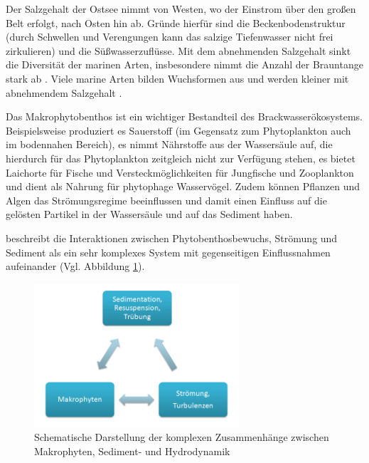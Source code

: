 Der Salzgehalt der Ostsee nimmt von Westen, wo der Einstrom über den großen Belt erfolgt, nach Osten hin ab. Gründe hierfür sind die Beckenbodenstruktur (durch Schwellen und Verengungen kann das salzige Tiefenwasser nicht frei zirkulieren) und die Süßwasserzuflüsse. Mit dem abnehmenden Salzgehalt sinkt die Diversität der marinen Arten, insbesondere nimmt die Anzahl der Brauntange stark ab \citep{schwenke_1995}. Viele marine Arten bilden Wuchsformen aus und werden kleiner mit abnehmendem Salzgehalt \citep{schwenke_1995}.

Das Makrophytobenthos ist ein wichtiger Bestandteil des Brackwasserökosystems. Beispielsweise produziert es Sauerstoff (im  Gegensatz zum Phytoplankton auch im bodennahen Bereich), es nimmt Nährstoffe aus der Wassersäule auf, die hierdurch für das Phytoplankton zeitgleich nicht zur Verfügung stehen, es bietet Laichorte für Fische und Versteckmöglichkeiten für Jungfische und Zooplankton und dient als Nahrung für phytophage Wasservögel.
Zudem können Pflanzen und Algen das Strömungsregime beeinflussen \citep{leonard_2006, li_2014, hurd_1997, siniscalchi_2012} und damit einen Einfluss auf die gelösten Partikel in der Wassersäule \citep{horppila_2003, leonard_1997, leonard_2006, ward_1984} und auf das Sediment \citep{madsen_2001} haben. 

\citep{madsen_2001} beschreibt die Interaktionen zwischen Phytobenthosbewuchs, Strömung und Sediment als ein sehr komplexes System mit gegenseitigen Einflussnahmen aufeinander (Vgl. Abbildung \ref{fig:schema_Makrophyten,Sedimente,Hydrodynamik}).


\begin{figure}[htb]
\centering
\includegraphics[width=0.68\textwidth]{images/Schema_Pfl_Sedim_Strm}
\caption[Zusammenhänge zwischen Makrophyten, Sediment- und Hydrodynamik]{Schematische Darstellung der komplexen Zusammenhänge zwischen Makrophyten, Sediment- und Hydrodynamik}
\label{fig:schema_Makrophyten,Sedimente,Hydrodynamik}
\end{figure}


